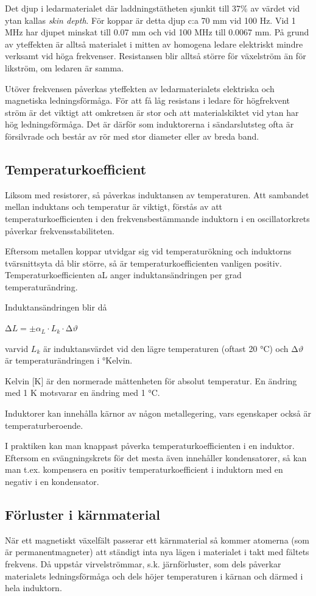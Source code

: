 Det djup i ledarmaterialet där laddningstätheten sjunkit till 37\% av
värdet vid ytan kallas \emph{skin depth}. För koppar är detta djup c:a 70 mm vid
100 Hz. Vid 1 MHz har djupet minskat till 0.07 mm och vid 100 MHz till
0.0067 mm. På grund av yteffekten är alltså materialet i mitten av homogena
ledare elektriskt mindre verksamt vid höga frekvenser. Resistansen blir alltså
större för växelström än för likström, om ledaren är samma.

Utöver frekvensen påverkas yteffekten av ledarmaterialets elektriska och
magnetiska ledningsförmåga. För att få låg resistans i ledare för högfrekvent
ström är det viktigt att omkretsen är stor och att materialskiktet vid ytan har
hög ledningsförmåga. Det är därför som induktorerna i sändarslutsteg ofta är
försilvrade och består av rör med stor diameter eller av breda band.

\subsection{Temperaturkoefficient}

Liksom med resistorer, så påverkas induktansen av temperaturen. Att sambandet
mellan induktans och temperatur är viktigt, förstås av att
temperaturkoefficienten i den frekvensbestämmande induktorn i en oscillatorkrets
påverkar frekvensstabiliteten.

Eftersom metallen koppar utvidgar sig vid temperaturökning och induktorns
tvärsnittsyta då blir större, så är temperaturkoefficienten vanligen positiv.
Temperaturkoefficienten aL anger induktansändringen per grad temperaturändring.

Induktansändringen blir då

\(∆L = \pm \alpha _L \cdot L_k \cdot ∆\vartheta\)

varvid \(L_k\) är induktansvärdet vid den lägre temperaturen (oftast 20 °C) och
\(∆\vartheta\) är temperaturändringen i °Kelvin.

Kelvin [K] är den normerade måttenheten för absolut temperatur. En ändring med
1 K motsvarar en ändring med 1 °C.

Induktorer kan innehålla kärnor av någon metallegering, vars egenskaper också är
temperaturberoende.

I praktiken kan man knappast påverka temperaturkoefficienten i en induktor.
Eftersom en svängningskrets för det mesta även innehåller kondensatorer, så kan
man t.ex. kompensera en positiv temperaturkoefficient i induktorn med en negativ
i en kondensator.

\subsection{Förluster i kärnmaterial}

När ett magnetiskt växelfält passerar ett kärnmaterial så kommer atomerna (som
är permanentmagneter) att ständigt inta nya lägen i materialet i takt med
fältets frekvens. Då uppstår virvelströmmar, s.k. järnförluster, som dels
påverkar materialets ledningsförmåga och dels höjer temperaturen i kärnan och
därmed i hela induktorn.
